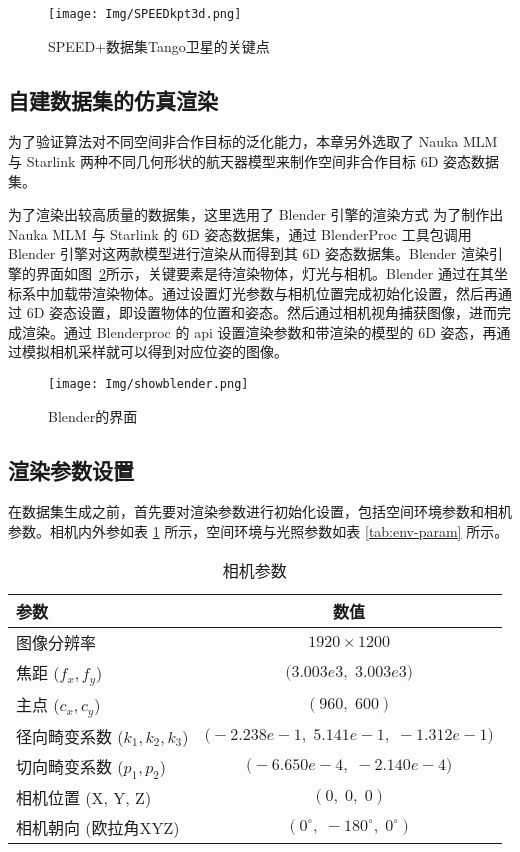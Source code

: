\begin{figure}[htbp]
	\centering
	\texttt{[image: Img/SPEEDkpt3d.png]}
	\caption{SPEED+数据集Tango卫星的关键点}
	\label{fig:SPEEDpluskpt}
	
\end{figure}

\subsection{自建数据集的仿真渲染}

为了验证算法对不同空间非合作目标的泛化能力，本章另外选取了 Nauka MLM 与 Starlink 两种不同几何形状的航天器模型来制作空间非合作目标 6D 姿态数据集。

为了渲染出较高质量的数据集，这里选用了 Blender 引擎的渲染方式
为了制作出 Nauka MLM 与 Starlink 的 6D 姿态数据集，通过 BlenderProc 工具包调用 Blender 引擎对这两款模型进行渲染从而得到其 6D 姿态数据集。Blender 渲染引擎的界面如图~\ref{fig:showblender}所示，关键要素是待渲染物体，灯光与相机。Blender 通过在其坐标系中加载带渲染物体。通过设置灯光参数与相机位置完成初始化设置，然后再通过 6D 姿态设置，即设置物体的位置和姿态。然后通过相机视角捕获图像，进而完成渲染。通过 Blenderproc 的 api 设置渲染参数和带渲染的模型的 6D 姿态，再通过模拟相机采样就可以得到对应位姿的图像。
\begin{figure}[htbp]
	\centering
	\texttt{[image: Img/showblender.png]}
	\caption{Blender的界面}
	\label{fig:showblender}
\end{figure}



\subsection{渲染参数设置}
在数据集生成之前，首先要对渲染参数进行初始化设置，包括空间环境参数和相机参数。相机内外参如表 \ref{tab:camera-param} 所示，空间环境与光照参数如表 \ref{tab:env-param} 所示。
\begin{table}[hbt]
	\centering
	\caption{相机参数}
	\label{tab:camera-param}
	\begin{tabular}{lc}
		\toprule[1.5pt]
		参数 & 数值 \\
		\midrule[1pt]
		图像分辨率 
		& $1920 \times 1200$ \\
		焦距 ($f_x, f_y$) 
		& $\bigl(3.003e3,\;3.003e3\bigr)$ \\
		主点 ($c_x, c_y$) 
		& $(960,\;600)$ \\
		径向畸变系数 ($k_1, k_2, k_3$) 
		& $\bigl(-2.238e-1,\;5.141e-1,\;-1.312e-1\bigr)$ \\
		切向畸变系数 ($p_1, p_2$) 
		& $\bigl(-6.650e-4,\;-2.140e-4\bigr)$ \\
		相机位置 (X, Y, Z) 
		& $(0,\;0,\;0)$ \\
		相机朝向 (欧拉角XYZ) 
		& $(0^\circ,\; -180^\circ,\; 0^\circ)$ \\
		\bottomrule[1.5pt]
	\end{tabular}
\end{table}


